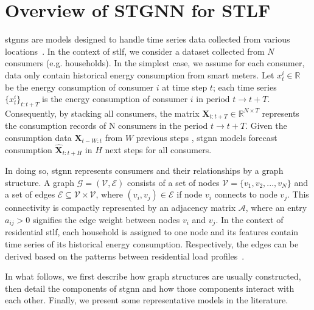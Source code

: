 \section{Overview of STGNN for STLF}\label{sec:background}


\glspl{stgnn} are models designed to handle time series data collected from various locations~\cite{cini_graph_2023}. In the context of \acrshort{stlf}, we consider a dataset collected from $N$ consumers (e.g. households). In the simplest case, we assume 
for each consumer, data only contain historical energy consumption from smart meters. 
Let $x^i_t \in \mathbb{R}$ be the energy consumption of consumer $i$ at time step $t$; each time series $\{x^i_t\}_{t:t+T}$ is the energy consumption of consumer $i$ in period $t \rightarrow t+T$. 
Consequently, by stacking all consumers, the matrix $\mathbf{X}_{t:t+T} \in \mathbb{R}^{N \times T}$ represents the consumption records of N consumers in the period $t \rightarrow t+T$. Given the consumption data $\mathbf{X}_{t-W:t}$ from $W$ previous steps , \acrshort{stgnn} models forecast consumption $\hat{\mathbf{X}}_{t:t+H}$ in $H$ next steps for all consumers. 

In doing so, \acrshort{stgnn} represents consumers and their relationships by a graph structure. A graph $\mathcal{G} = (\mathcal{V}, \mathcal{E})$ consists of a set of nodes $\mathcal{V} = \{v_1,v_2,...,v_N\}$ and a set of edges $\mathcal{E} \subseteq \mathcal{V} \times \mathcal{V}$, where $(v_i,v_j) \in \mathcal{E}$ if node $v_i$ connects to node $v_j$. This connectivity is compactly represented by an adjacency matrix $\mathcal{A}$, where an entry $a_{ij} > 0$ signifies the edge weight between nodes $v_i$ and $v_j$. In the context of residential \acrshort{stlf}, each household is assigned to one node and its features contain time series  of its historical energy consumption. Respectively, the edges can be derived based on the patterns between residential load profiles~\cite{wang_short-term_2023}. 

In what follows, we first describe how graph structures are usually constructed, then detail the components of \acrshort{stgnn} and how those components interact with each other. Finally, we present some representative models in the literature.

